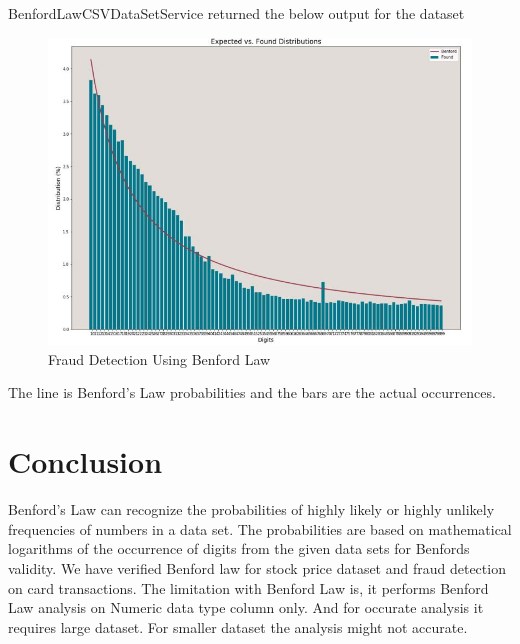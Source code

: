 BenfordLawCSVDataSetService returned the below
output for the dataset ~\cite{hid-sp18-514-purchase-card-ds}

\begin{figure}[!ht]
\centering\includegraphics[width=\columnwidth]{images/benford_card_transactions.JPG}
  \caption{Fraud Detection Using Benford Law}\label{f:card-ds-benfordlaw}
\end{figure}

The line is Benford’s Law probabilities and the bars are 
the actual occurrences.


\section {Conclusion}
Benford’s Law can recognize the probabilities of highly 
likely or highly unlikely frequencies of numbers in a data set.
The probabilities are based on mathematical logarithms of 
the occurrence of digits from the given data sets for Benfords 
validity. We have verified Benford law for
stock price dataset and fraud detection on card transactions.
The limitation with Benford Law is, it performs Benford Law
analysis on Numeric data type column only. And for occurate
analysis it requires large dataset. For smaller dataset 
the analysis might not accurate.


 
